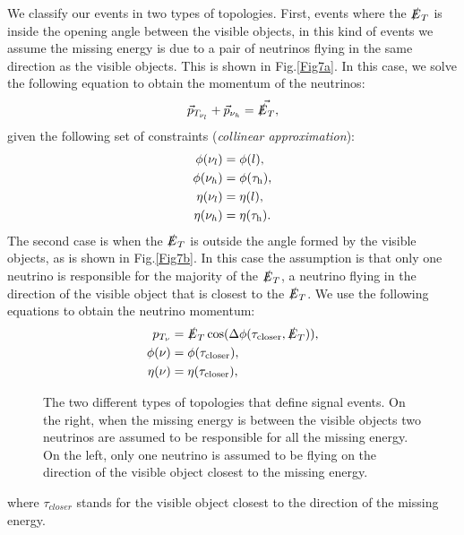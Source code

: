 We classify our events in two types of topologies. First, events where the $\slashed{E}_T$ is inside the opening angle between the visible objects, in this kind of events we assume the missing energy is due to a pair of neutrinos flying in the same direction as the visible objects. This is shown in Fig.\ref{Fig7a}. In this case, we solve the following equation to obtain the momentum of the neutrinos:
\begin{equation}
	\vec{p}_{T_{\nu_l}}+\vec{p}_{\nu_h}=\vec{\slashed{E}_T},
\end{equation}
given the following set of constraints (\textit{collinear approximation}):
\begin{align}
	\phi(\nu_l)&=\phi(l),
	\\
	\phi(\nu_h)&=\phi(\tau_\text{h}),
	\\
	\eta(\nu_l)&=\eta(l),
	\\
	\eta(\nu_h)&=\eta(\tau_\text{h}).
\end{align}
The second case is when the $\slashed{E}_T$ is outside the angle formed by the visible objects, as is shown in Fig.\ref{Fig7b}. In this case the assumption is that only one neutrino is responsible for the majority of the $\slashed{E}_T$, a neutrino flying in the direction of the visible object that is closest to the $\slashed{E}_T$. We use the following equations to obtain the neutrino momentum:
\begin{align}
p_{T_{\nu}}&=\slashed{E}_T \cos(\Delta\phi(\tau_{\text{closer}},\slashed{E}_T)),
\\
\phi(\nu)&=\phi(\tau_{\text{closer}}),
\\
\eta(\nu)&=\eta(\tau_{\text{closer}}),
\end{align} 
\begin{figure}[ht]
	\centering
	\hfill
	\caption{The two different types of topologies that define signal events. On the right, when the missing energy is between the visible objects two neutrinos are assumed to be responsible for all the missing energy. On the left, only one neutrino is assumed to be flying on the direction of the visible object closest to the missing energy.}
	\label{Fig7}
\end{figure}
where $\tau_{closer}$ stands for the visible object closest to the direction of the missing energy.

